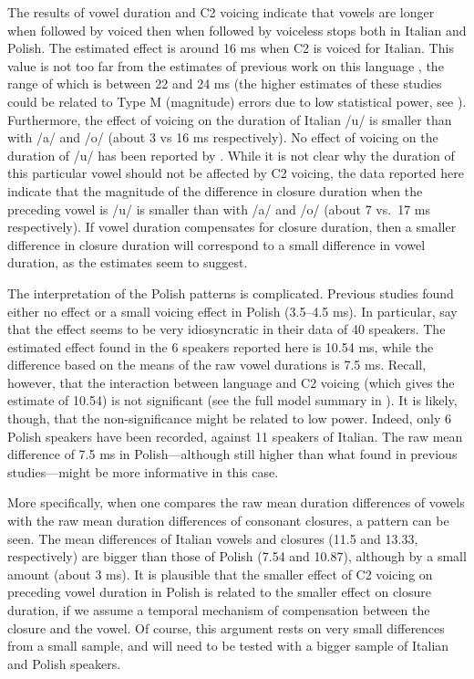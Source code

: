 \documentclass[12pt,]{article}
\begin{document}
The results of vowel duration and C2 voicing indicate that vowels are
longer when followed by voiced then when followed by voiceless stops
both in Italian and Polish. The estimated effect is around 16 ms when C2
is voiced for Italian. This value is not too far from the estimates of
previous work on this language
\citep{caldognetto1979, farnetani1986, esposito2002}, the range of which
is between 22 and 24 ms (the higher estimates of these studies could be
related to Type M (magnitude) errors due to low statistical power, see
\citealt{kirby2018}). Furthermore, the effect of voicing on the duration
of Italian /u/ is smaller than with /a/ and /o/ (about 3 vs 16 ms
respectively). No effect of voicing on the duration of /u/ has been
reported by \citealt{ferrero1978}. While it is not clear why the
duration of this particular vowel should not be affected by C2 voicing,
the data reported here indicate that the magnitude of the difference in
closure duration when the preceding vowel is /u/ is smaller than with
/a/ and /o/ (about 7 vs.~17 ms respectively). If vowel duration
compensates for closure duration, then a smaller difference in closure
duration will correspond to a small difference in vowel duration, as the
estimates seem to suggest.

The interpretation of the Polish patterns is complicated. Previous
studies found either no effect or a small voicing effect in Polish
(3.5--4.5 ms). In particular, \citet{malisz2008} say that the effect
seems to be very idiosyncratic in their data of 40 speakers. The
estimated effect found in the 6 speakers reported here is 10.54 ms,
while the difference based on the means of the raw vowel durations is
7.5 ms. Recall, however, that the interaction between language and C2
voicing (which gives the estimate of 10.54) is not significant (see the
full model summary in ). It is likely, though, that
the non-significance might be related to low power. Indeed, only 6
Polish speakers have been recorded, against 11 speakers of Italian. The
raw mean difference of 7.5 ms in Polish---although still higher than
what found in previous studies---might be more informative in this case.

More specifically, when one compares the raw mean duration differences
of vowels with the raw mean duration differences of consonant closures,
a pattern can be seen. The mean differences of Italian vowels and
closures (11.5 and 13.33, respectively) are bigger than those of Polish
(7.54 and 10.87), although by a small amount (about 3 ms). It is
plausible that the smaller effect of C2 voicing on preceding vowel
duration in Polish is related to the smaller effect on closure duration,
if we assume a temporal mechanism of compensation between the closure
and the vowel. Of course, this argument rests on very small differences
from a small sample, and will need to be tested with a bigger sample of
Italian and Polish speakers.
\end{document}
